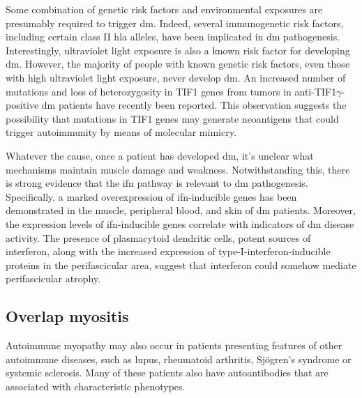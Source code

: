 Some combination of genetic risk factors and environmental exposures are presumably required to trigger \gls{dm}. Indeed, several immunogenetic risk factors, including certain class II \gls{hla} alleles, have been implicated in \gls{dm} pathogenesis.\cite{Miller2015} Interestingly, ultraviolet light exposure is also a known risk factor for developing \gls{dm}.\cite{Mamyrova2017} However, the majority of people with known genetic risk factors, even those with high ultraviolet light exposure, never develop \gls{dm}. An increased number of mutations and loss of heterozygosity in TIF1 genes from tumors in anti-TIF1$\gamma$-positive \gls{dm} patients have recently been reported.\cite{PinalFernandez2018} This observation suggests the possibility that mutations in TIF1 genes may generate neoantigens that could trigger autoimmunity by means of molecular mimicry.

Whatever the cause, once a patient has developed \gls{dm}, it’s unclear what mechanisms maintain muscle damage and weakness. Notwithstanding this, there is strong evidence that the \gls{ifn} pathway is relevant to \gls{dm} pathogenesis.\cite{Greenberg2005} Specifically, a marked overexpression of \gls{ifn}-inducible genes has been demonstrated in the muscle,\cite{Greenberg2005} peripheral blood,\cite{Walsh2007,Baechler2007} and skin\cite{Wong2012} of \gls{dm} patients. Moreover, the expression levels of \gls{ifn}-inducible genes correlate with indicators of \gls{dm} disease activity.\cite{Walsh2007,Baechler2007} The presence of plasmacytoid dendritic cells, potent sources of interferon, along with the increased expression of type-I-interferon-inducible proteins in the perifascicular area, suggest that interferon could somehow mediate perifascicular atrophy.\cite{SuarezCalvet2017,Greenberg2005} 

\subsection{Overlap myositis}

Autoimmune myopathy may also occur in patients presenting features of other autoimmune diseases, such as lupus, rheumatoid arthritis, Sjögren's syndrome or systemic sclerosis.\cite{GuillenDelCastillo2014,Rigolet2012,EscolaVerge2017} Many of these patients also have autoantibodies that are associated with characteristic phenotypes.\cite{GuillenDelCastillo2014,Rigolet2012,EscolaVerge2017}

